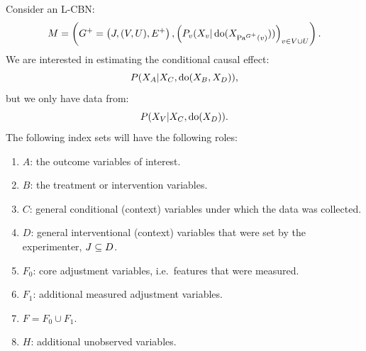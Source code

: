 \begin{Not}
Consider an L-CBN:
        \[M= \left ( G^+=\left ( J,(V,U),E^+ \right ), \left ( P_v ( X_v|\operatorname{do}( X_{\mathrm{Pa}^{G^+}(v)})) \right )_{v \in V \cup U} \right ).\]
We are interested in estimating the conditional causal effect:
\[ P(X_A|X_C,\operatorname{do}(X_B,X_D)), \]
but we only have data from:
\[ P(X_V|X_C,\operatorname{do}(X_D)). \]
The following index sets will have the following roles:
\begin{enumerate}
    \item $A$: the outcome variables of interest.
    \item $B$: the treatment or intervention variables.
    \item $C$: general conditional (context) variables under which the data was collected.
    \item $D$: general interventional (context) variables that were set by the experimenter, $J \subseteq D$.
    \item $F_0$: core adjustment variables, i.e.\ features that were measured.
    \item $F_1$: additional measured adjustment variables.
    \item $F = F_0 \cup F_1$.
    \item $H$: additional unobserved variables.
\end{enumerate}


\end{Not}


